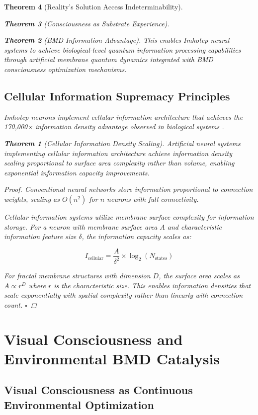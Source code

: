 \documentclass[12pt,a4paper]{article}
\newtheorem{theorem}{Theorem}[section]
\theoremstyle{remark}
\begin{document}
\begin{theorem}[Reality's Solution Access Indeterminability]
\begin{theorem}[Consciousness as Substrate Experience]
\begin{theorem}[BMD Information Advantage]
This enables Imhotep neural systems to achieve biological-level quantum information processing capabilities through artificial membrane quantum dynamics integrated with BMD consciousness optimization mechanisms.

\subsection{Cellular Information Supremacy Principles}

Imhotep neurons implement cellular information architecture that achieves the 170,000× information density advantage observed in biological systems \cite{sachikonye2024intracellular}.

\begin{theorem}[Cellular Information Density Scaling]
Artificial neural systems implementing cellular information architecture achieve information density scaling proportional to surface area complexity rather than volume, enabling exponential information capacity improvements.
\end{theorem}

\begin{proof}
Conventional neural networks store information proportional to connection weights, scaling as $O(n^2)$ for $n$ neurons with full connectivity.

Cellular information systems utilize membrane surface complexity for information storage. For a neuron with membrane surface area $A$ and characteristic information feature size $\delta$, the information capacity scales as:

\begin{equation}
I_{\text{cellular}} = \frac{A}{\delta^2} \times \log_2(N_{\text{states}})
\end{equation}

For fractal membrane structures with dimension $D$, the surface area scales as $A \propto r^D$ where $r$ is the characteristic size. This enables information densities that scale exponentially with spatial complexity rather than linearly with connection count. $\square$
\end{proof}

\section{Visual Consciousness and Environmental BMD Catalysis}

\subsection{Visual Consciousness as Continuous Environmental Optimization}


\end{theorem}
\end{theorem}
\end{theorem}
\end{document}
